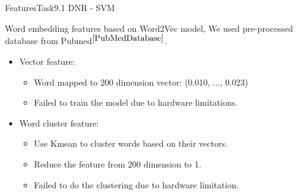 \documentclass[xcolor=table]{beamer}
\begin{document}
\begin{frame}{Features}{Task9.1 DNR - SVM}

Word embedding features based on Word2Vec model, We used pre-processed database from Pubmed$^{\cite{PubMedDatabase}}$.

\begin{itemize}
    \item Vector feature:
    \begin{itemize}
        \item  Word mapped to 200 dimension vector: (0.010, ..., 0.023)
        \item Failed to train the model due to hardware limitations.
    \end{itemize}
    \item Word cluster feature:
    \begin{itemize}
        \item Use Kmean to cluster words based on their vectors.
        \item Reduce the feature from 200 dimension to 1.
        \item Failed to do the clustering due to hardware limitation.
    \end{itemize}
\end{itemize}
\end{frame}

\end{document}
